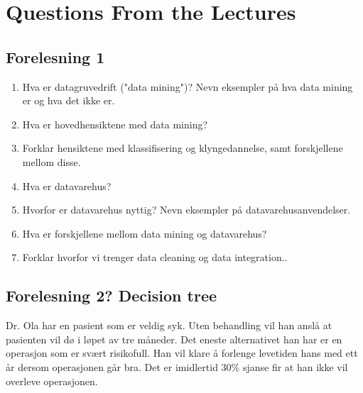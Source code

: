 \chapter{Questions From the Lectures}

	\section{Forelesning 1}
		\begin{enumerate}
			\item Hva er datagruvedrift ("data mining")? Nevn eksempler på hva data mining er
			og hva det ikke er. 
			\item Hva er hovedhensiktene med data mining?
			\item Forklar hensiktene med klassifisering og klyngedannelse, samt forskjellene
			mellom disse. 
			\item Hva er datavarehus?
			\item Hvorfor er datavarehus nyttig? Nevn eksempler på datavarehusanvendelser.
			\item Hva er forskjellene mellom data mining og datavarehus?
			\item Forklar hvorfor vi trenger data cleaning og data integration..
		\end{enumerate}


	\section{Forelesning 2? Decision tree}

		Dr. Ola har en pasient som er veldig syk. Uten behandling vil han anslå at pasienten vil dø i løpet
		av tre måneder. Det eneste alternativet han har er en operasjon som er svært risikofull. Han vil klare
		å forlenge levetiden hans med ett år dersom operasjonen går bra. Det er imidlertid 30\% sjanse
		fir at han ikke vil overleve operasjonen. 

